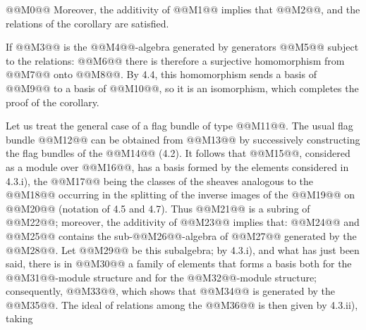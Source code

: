@@M0@@
Moreover, the additivity of @@M1@@ implies that @@M2@@, and the relations of the corollary are satisfied.

If @@M3@@ is the @@M4@@-algebra generated by generators @@M5@@ subject to the relations:
@@M6@@
there is therefore a surjective homomorphism from @@M7@@ onto @@M8@@. By 4.4, this homomorphism sends a basis of @@M9@@ to a basis of @@M10@@, so it is an isomorphism, which completes the proof of the corollary.

Let us treat the general case of a flag bundle of type @@M11@@. The usual flag bundle @@M12@@ can be obtained from @@M13@@ by successively constructing the flag bundles of the @@M14@@ (4.2). It follows that @@M15@@, considered as a module over @@M16@@, has a basis formed by the elements considered in 4.3.i), the @@M17@@ being the classes of the sheaves analogous to the @@M18@@ occurring in the splitting of the inverse images of the @@M19@@ on @@M20@@ (notation of 4.5 and 4.7). Thus @@M21@@ is a subring of @@M22@@; moreover, the additivity of @@M23@@ implies that:
@@M24@@
and @@M25@@ contains the sub-@@M26@@-algebra of @@M27@@ generated by the @@M28@@. Let @@M29@@ be this subalgebra; by 4.3.i), and what has just been said, there is in @@M30@@ a family of elements that forms a basis both for the @@M31@@-module structure and for the @@M32@@-module structure; consequently, @@M33@@, which shows that @@M34@@ is generated by the @@M35@@. The ideal of relations among the @@M36@@ is then given by 4.3.ii), taking
